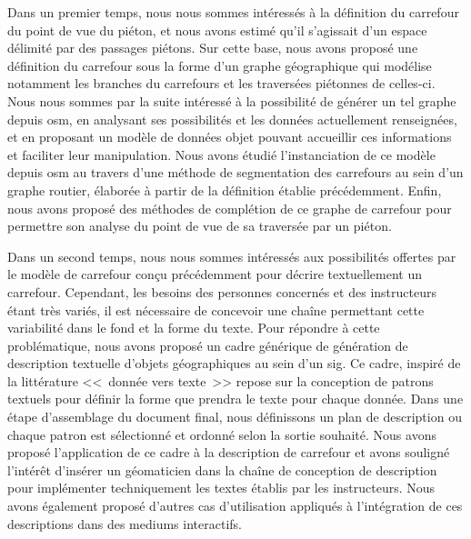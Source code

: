 \newpar{}


Dans un premier temps, nous nous sommes intéressés à la définition du carrefour du point de vue du piéton, et nous avons estimé qu'il s'agissait d'un espace délimité par des passages piétons. Sur cette base, nous avons proposé une définition du carrefour sous la forme d'un graphe géographique qui modélise notamment les branches du carrefours et les traversées piétonnes de celles-ci. Nous nous sommes par la suite intéressé à la possibilité de générer un tel graphe depuis \gls{osm}, en analysant ses possibilités et les données actuellement renseignées, et en proposant un modèle de données objet pouvant accueillir ces informations et faciliter leur manipulation. Nous avons étudié l'instanciation de ce modèle depuis \gls{osm} au travers d'une méthode de segmentation des carrefours au sein d'un graphe routier, élaborée à partir de la définition établie précédemment. Enfin, nous avons proposé des méthodes de complétion de ce graphe de carrefour pour permettre son analyse du point de vue de sa traversée par un piéton.

\newpar{}


Dans un second temps, nous nous sommes intéressés aux possibilités offertes par le modèle de carrefour conçu précédemment pour décrire textuellement un carrefour. Cependant, les besoins des personnes concernés et des instructeurs étant très variés, il est nécessaire de concevoir une chaîne permettant cette variabilité dans le fond et la forme du texte. Pour répondre à cette problématique, nous avons proposé un cadre générique de génération de description textuelle d'objets géographiques au sein d'un \gls{sig}. Ce cadre, inspiré de la littérature <<~donnée vers texte~>> repose sur la conception de patrons textuels pour définir la forme que prendra le texte pour chaque donnée. Dans une étape d'assemblage du document final, nous définissons un plan de description ou chaque patron est sélectionné et ordonné selon la sortie souhaité. Nous avons proposé l'application de ce cadre à la description de carrefour et avons souligné l'intérêt d'insérer un géomaticien dans la chaîne de conception de description pour implémenter techniquement les textes établis par les instructeurs. Nous avons également proposé d'autres cas d'utilisation appliqués à l'intégration de ces descriptions dans des mediums interactifs.

\newpar{}


